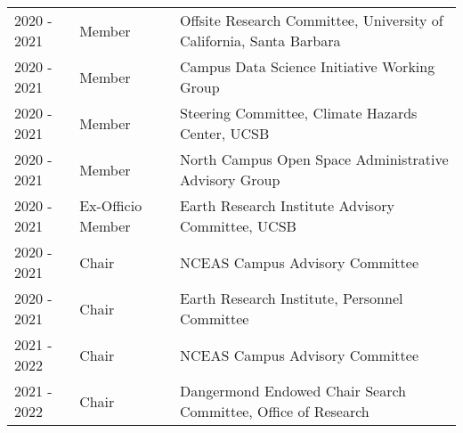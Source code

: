 \begin{longtable}{llp{12cm}}
2020 - 2021 & Member & Offsite Research Committee, University of California, Santa Barbara \\
2020 - 2021 & Member & Campus Data Science Initiative Working Group \\
2020 - 2021 & Member & Steering Committee, Climate Hazards Center, UCSB \\
2020 - 2021 & Member & North Campus Open Space Administrative Advisory Group \\
2020 - 2021 & Ex-Officio Member & Earth Research Institute Advisory Committee, UCSB \\
2020 - 2021 & Chair & NCEAS Campus Advisory Committee  \\
2020 - 2021 & Chair & Earth Research Institute, Personnel Committee \\
2021 - 2022 & Chair & NCEAS Campus Advisory Committee  \\
2021 - 2022 & Chair & Dangermond Endowed Chair Search Committee, Office of Research \\
\end{longtable}

